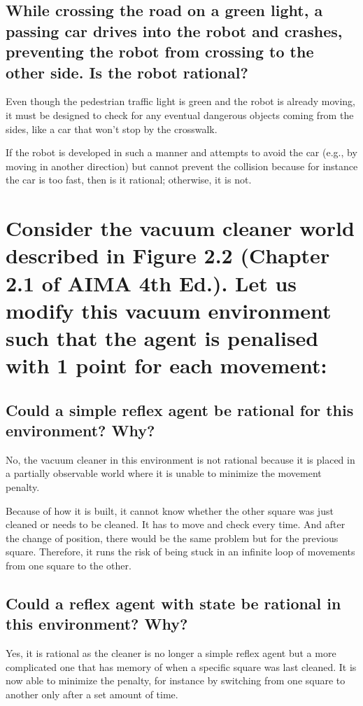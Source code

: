 \documentclass{article}
\begin{document}
\subsection{While crossing the road on a green light, a passing car drives into the robot and crashes, preventing the robot from crossing to the other side. Is the robot rational?}
Even though the pedestrian traffic light is green and the robot is already moving, it must be designed to check for any eventual dangerous objects coming from the sides, like a car that won’t stop by the crosswalk. 

If the robot is developed in such a manner and attempts to avoid the car (e.g., by moving in another direction) but cannot prevent the collision because for instance the car is too fast, then is it rational; otherwise, it is not.


\section{Consider the vacuum cleaner world described in Figure 2.2 (Chapter 2.1 of AIMA 4th Ed.).
Let us modify this vacuum environment such that the agent is penalised with 1 point for each
movement:}

\subsection{Could a simple reflex agent be rational for this environment? Why?}
No, the vacuum cleaner in this environment is not rational because it is placed in a partially observable world where it is unable to minimize the movement penalty. 

Because of how it is built, it cannot know whether the other square was just cleaned or needs to be cleaned.
It has to move and check every time. 
And after the change of position, there would be the same problem but for the previous square.
Therefore, it runs the risk of being stuck in an infinite loop of movements from one square to the other.

\subsection{Could a reflex agent with state be rational in this environment? Why?}
Yes, it is rational as the cleaner is no longer a simple reflex agent but a more complicated one that has memory of when a specific square was last cleaned.
It is now able to minimize the penalty, for instance by switching from one square to another only after a set amount of time.
\end{document}
